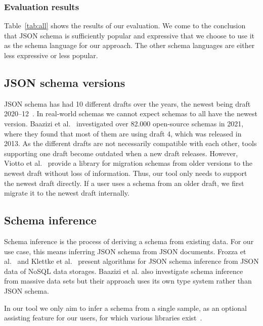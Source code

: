 \subsubsection{Evaluation results}

Table~\ref{tab:all} shows the results of our evaluation.
We come to the conclusion that JSON schema is sufficiently popular and expressive that we choose to use it as the schema language for our approach.
The other schema languages are either less expressive or less popular.


\subsection{JSON schema versions}\label{subsec:json-schema-versions}

JSON schema has had 10 different drafts over the years, the newest being draft 2020--12~\cite{jsonschemaJSONSchema}.
In real-world schemas we cannot expect schemas to all have the newest version.
Baazizi et al.~\cite{baazizi2021empirical} investigated over 82.000 open-source schemas in 2021, where they found that most of them are using draft 4, which was released in 2013.
As the different drafts are not necessarily compatible with each other, tools supporting one draft become outdated when a new draft releases.
However, Viotto et al.~\cite{Viotti_Lagoni_2023} provide a library for migration schemas from older versions to the newest draft without loss of information.
Thus, our tool only needs to support the newest draft directly.
If a user uses a schema from an older draft, we first migrate it to the newest draft internally.


\subsection{Schema inference}\label{subsec:schema-inference}

Schema inference is the process of deriving a schema from existing data.
For our use case, this means inferring JSON schema from JSON documents.
Frozza et al.~\cite{8424731} and Klettke et al.~\cite{klettke} present algorithms for JSON schema inference from JSON data of NoSQL data storages.
Baazizi et al.\cite{Baazizi2019} also investigate schema inference from massive data sets but their approach uses its own type system rather than JSON schema.

In our tool we only aim to infer a schema from a single sample, as an optional assisting feature for our users, for which various libraries exist~\cite{githubGitHubJsonsystemspublic, githubGitHubSaasquatchjsonschemainferrer, probst_siegel_2023}.